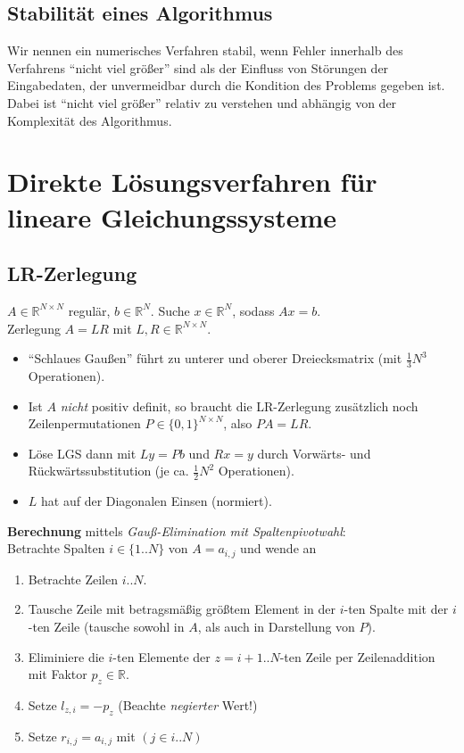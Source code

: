 \documentclass[a4paper]{article}
\newcommand{\set}[1]{\{ #1 \}}
\begin{document}
\subsection{Stabilität eines Algorithmus}

Wir nennen ein numerisches Verfahren stabil, wenn Fehler innerhalb des
Verfahrens \enquote{nicht viel größer} sind als der Einfluss von Störungen der
Eingabedaten, der unvermeidbar durch die Kondition des Problems gegeben ist.
Dabei ist \enquote{nicht viel größer} relativ zu verstehen und abhängig von der
Komplexität des Algorithmus.

\section{Direkte Lösungsverfahren für lineare Gleichungssysteme}

\subsection{LR-Zerlegung}

$ A \in \mathbb{R}^{N \times N} $ regulär, $b \in \mathbb{R}^N$.
Suche $ x \in \mathbb{R}^{N} $, sodass $Ax=b$.
\\
Zerlegung $A = LR$ mit $L, R \in \mathbb{R}^{N \times N}$.

\begin{itemize}
    \item \enquote{Schlaues Gaußen} führt zu unterer und oberer Dreiecksmatrix
    (mit $\frac{1}{3}N^3$ Operationen).
    \item Ist $A$ \emph{nicht} positiv definit, so braucht die LR-Zerlegung
    zusätzlich noch Zeilenpermutationen $P \in \set{0, 1}^{N \times N} $, 
    also $PA = LR$.
    \item Löse LGS dann mit $Ly = Pb$ und $Rx = y$ durch Vorwärts- und
    Rückwärtssubstitution (je ca. $\frac{1}{2}N^2$ Operationen).
    \item $L$ hat auf der Diagonalen Einsen (normiert).
\end{itemize}

\begin{samepage}
\textbf{Berechnung} mittels \emph{Gauß-Elimination mit Spaltenpivotwahl}:
\\
Betrachte Spalten $i \in \set{1..N}$ von $A = a_{i, j}$ und wende an
\begin{enumerate}
    \item Betrachte Zeilen $i..N$.
    \item Tausche Zeile mit betragsmäßig größtem Element in der $i$-ten Spalte
    mit der $i$-ten Zeile (tausche sowohl in $A$, als auch in Darstellung von
    $P$).
    \item Eliminiere die $i$-ten Elemente der $z = i+1..N$-ten Zeile per
    Zeilenaddition mit Faktor $p_z \in \mathbb{R}$.
    \item Setze $l_{z, i} = -p_z$ (Beachte \emph{negierter} Wert!)
    \item Setze $r_{i, j} = a_{i, j}$ mit $(j \in {i..N})$
\end{enumerate}
\end{samepage}
\end{document}
